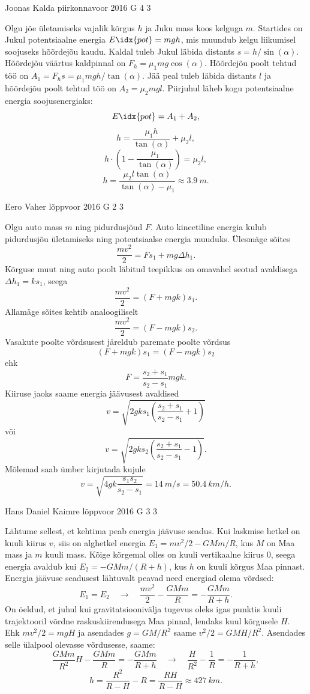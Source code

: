 \documentclass[11pt, twoside]{article}
\begin{document}
{%
{Joonas Kalda} %
{piirkonnavoor} %
{2016} %
{G 4} %
{3} %
{

\ifSolution
Olgu jõe ületamiseks vajalik kõrgus $h$ ja Juku mass koos kelguga $m$. Startides on Jukul potentsiaalne energia $E\idx{pot} = mgh$, mis muundub kelgu liikumisel soojuseks hõõrdejõu kaudu. Kaldal tuleb Jukul läbida distants $s = h/\sin(\alpha)$. Hõõrdejõu väärtus kaldpinnal on $F_h=\mu_1 mg \cos(\alpha)$. Hõõrdejõu poolt tehtud töö on $A_1 = F_h s = {\mu_1}mgh/\tan(\alpha)$. Jää peal tuleb läbida distants $l$ ja hõõrdejõu poolt tehtud töö on $A_2 = {\mu_2}mgl$. Piirjuhul läheb kogu potentsiaalne energia soojusenergiaks:
$$E\idx{pot} = A_1 + A_2,$$
$$h =\frac{\mu_1 h}{\tan(\alpha)} + {\mu_2} l, $$
$$h \cdot \left(1 - \frac{\mu_1}{\tan(\alpha)}\right) = {\mu_2} l,$$
$$h = \frac{\mu_2 l \tan(\alpha)}{\tan(\alpha) - {\mu_1}} \approx \SI{3.9}{m}.$$
\fi
}

{Eero Vaher} %
{lõppvoor} %
{2016} %
{G 2} %
{3} %
{

\ifSolution
Olgu auto mass $m$ ning pidurdusjõud $F$. Auto kineetiline energia kulub pidurdusjõu ületamiseks ning potentsiaalse energia muuduks. Ülesmäge sõites
\[
\frac{mv^2}{2}=Fs_1+mg\Delta h_1.
\]
Kõrguse muut ning auto poolt läbitud teepikkus on omavahel seotud avaldisega $\Delta h_1=ks_1$, seega
\[
\frac{mv^2}{2}=\left(F+mgk\right)s_1.
\]
Allamäge sõites kehtib analoogiliselt
\[
\frac{mv^2}{2}=\left(F-mgk\right)s_2.
\]
Vasakute poolte võrdsusest järeldub paremate poolte võrdsus 
\[
\left(F+mgk\right)s_1=\left(F-mgk\right)s_2
\]
ehk
\[
F=\frac{s_2+s_1}{s_2-s_1}mgk.
\]
Kiiruse jaoks saame energia jäävusest avaldised 
\[
v=\sqrt{2gks_1\left(\frac{s_2+s_1}{s_2-s_1}+1\right)}
\]
või
\[
v=\sqrt{2gks_2\left(\frac{s_2+s_1}{s_2-s_1}-1\right)}.
\]
Mõlemad saab ümber kirjutada kujule 
\[
v=\sqrt{4gk\frac{s_1s_2}{s_2-s_1}}=\SI{14}{m \per s}=\SI{50.4}{km \per h}.
\]
\fi
}

{Hans Daniel Kaimre} %
{lõppvoor} %
{2016} %
{G 3} %
{3} %
{

\ifSolution
Lähtume sellest, et kehtima peab energia jäävuse seadus. Kui laskmise hetkel on kuuli kiirus $v$, siis on alghetkel energia $E_1 = mv^2/2 - GMm/R$, kus $M$ on Maa mass ja $m$ kuuli mass. Kõige kõrgemal olles on kuuli vertikaalne kiirus \num{0}, seega energia avaldub kui $E_2 = -GMm/(R+h)$, kus $h$ on kuuli kõrgus Maa pinnast. Energia jäävuse seadusest lähtuvalt peavad need energiad olema võrdsed:$$E_1 = E_2 \quad\rightarrow\quad \frac{mv^2}{2} - \frac{GMm}{R} = -\frac{GMm}{R+h}.$$
On öeldud, et juhul kui gravitatsioonivälja tugevus oleks igas punktis kuuli trajektooril võrdne raskuskiirendusega Maa pinnal, lendaks kuul kõrgusele $H$. Ehk $mv^2/2=mgH$ ja asendades $g=GM/R^2$ saame $v^2/2=GMH/R^2$. Asendades selle ülalpool olevasse võrdusesse, saame:
$$\frac{GMm}{R^2}H - \frac{GMm}{R} = -\frac{GMm}{R+h} \quad\rightarrow\quad \frac{H}{R^2}-\frac{1}{R} = - \frac{1}{R+h},$$
$$h=\frac{R^2}{R-H} - R = \frac{RH}{R-H} \approx \SI{427}{km}.$$
\fi
}

}
\end{document}
